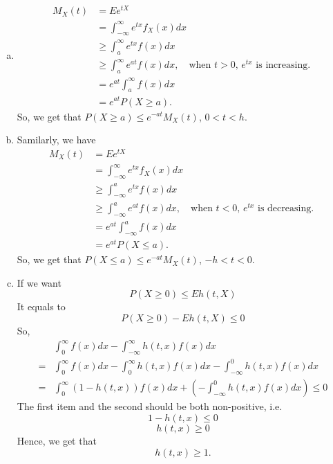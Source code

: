\documentclass[14pt]{elegantbook}
\begin{document}
    \begin{solution}
        \begin{enumerate}[(a)]
            \item \begin{align*}
                M_X(t) &= Ee^{tX} \\
                &= \int_{-\infty}^{\infty} e^{tx}f_X(x)dx \\
                &\geq \int_{a}^{\infty} e^{tx}f(x)dx \\
                &\geq \int_{a}^{\infty} e^{at}f(x)dx, \quad \text{when $t>0$, $e^{tx}$ is increasing. }  \\
                &= e^{at}\int_{a}^{\infty} f(x)dx \\
                &= e^{at}P(X\geq a). 
            \end{align*}
            So, we get that $P(X\geq a)\leq e^{-at}M_X(t)$, $0<t<h$. 
            \item Samilarly, we have
            \begin{align*}
                M_X(t) &= Ee^{tX} \\
                &= \int_{-\infty}^{\infty} e^{tx}f_X(x)dx \\
                &\geq \int_{-\infty}^{a} e^{tx}f(x)dx \\
                &\geq \int_{-\infty}^{a} e^{at}f(x)dx, \quad \text{when $t<0$, $e^{tx}$ is decreasing. }  \\
                &= e^{at}\int_{-\infty}^{a} f(x)dx \\
                &= e^{at}P(X\leq a). 
            \end{align*}
            So, we get that $P(X\leq a)\leq e^{-at}M_X(t)$, $-h<t<0$.
            \item If we want \[P(X\geq0)\leq Eh(t,X)\]
            It equals to \[P(X\geq0)-Eh(t,X)\leq 0\]
            So, \begin{align*}
                &\int_{0}^{\infty}f(x)dx - \int_{-\infty}^{\infty} h(t,x)f(x)dx\\
                =&\int_{0}^{\infty}f(x)dx - \int_{0}^{\infty} h(t,x)f(x)dx- \int_{-\infty}^{0} h(t,x)f(x)dx\\
                =&\int_{0}^{\infty}(1-h(t, x))f(x)dx+\left( - \int_{-\infty}^{0} h(t,x)f(x)dx\right)\leq 0
            \end{align*}
            The first item and the second should be both non-positive, i.e. 
            \[1-h(t,x)\leq 0\]
            \[h(t, x)\geq 0 \]
            Hence, we get that 
            \[h(t,x)\geq1 .\]
        \end{enumerate}
    \end{solution}
\end{document}
